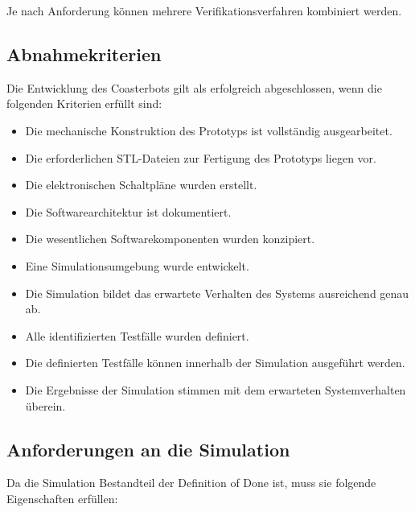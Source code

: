 Je nach Anforderung können mehrere Verifikationsverfahren kombiniert
werden.

\subsection{Abnahmekriterien}\label{abnahmekriterien}

Die Entwicklung des Coasterbots gilt als erfolgreich abgeschlossen, wenn
die folgenden Kriterien erfüllt sind:

\begin{itemize}
\tightlist
\item
  Die mechanische Konstruktion des Prototyps ist vollständig
  ausgearbeitet.
\item
  Die erforderlichen STL-Dateien zur Fertigung des Prototyps liegen vor.
\item
  Die elektronischen Schaltpläne wurden erstellt.
\item
  Die Softwarearchitektur ist dokumentiert.
\item
  Die wesentlichen Softwarekomponenten wurden konzipiert.
\item
  Eine Simulationsumgebung wurde entwickelt.
\item
  Die Simulation bildet das erwartete Verhalten des Systems ausreichend
  genau ab.
\item
  Alle identifizierten Testfälle wurden definiert.
\item
  Die definierten Testfälle können innerhalb der Simulation ausgeführt
  werden.
\item
  Die Ergebnisse der Simulation stimmen mit dem erwarteten
  Systemverhalten überein.
\end{itemize}

\subsection{Anforderungen an die
Simulation}\label{anforderungen-an-die-simulation}

Da die Simulation Bestandteil der Definition of Done ist, muss sie
folgende Eigenschaften erfüllen:

